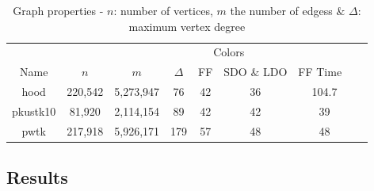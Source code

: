 \documentclass[preprint]{sigplanconf}
\begin{document}
%



\begin{table}
\scriptsize
\begin{tabular}{c c c c c c c c }
\hline
  &   &  &  \multicolumn{3}{c}{Colors} &  \\
Name & $n$ & $m$ & $\Delta$ & FF & SDO $\&$ LDO & FF Time \
\\
\hline
hood & 220,542 & 5,273,947 & 76 & 42 & 36 & 104.7\\
pkustk10 & 81,920 & 2,114,154 & 89 & 42 & 42 & 39\\
pwtk & 217,918 & 5,926,171 & 179 & 57 & 48 & 48\\
\end{tabular}
\caption{Graph properties - 
$n$: number of vertices, $m$ the number of edgess $\&$ $\Delta$: maximum vertex degree}
\label{tbl:properties}

\end{table}

\subsection{Results}
\end{document}
